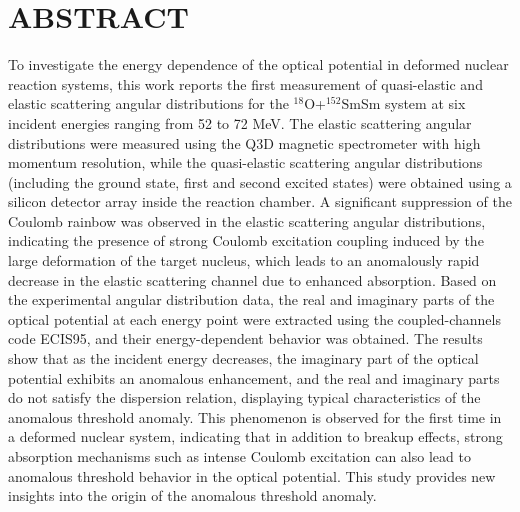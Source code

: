 \chapter*{ABSTRACT}%
\linespread{1.25}\selectfont%
To investigate the energy dependence of the optical potential in deformed nuclear reaction systems, this work reports the first measurement of quasi-elastic and elastic scattering angular distributions for the $^{18}\mathrm{O}$+$^{152}\mathrm{Sm}$Sm system at six incident energies ranging from 52 to 72 MeV. The elastic scattering angular distributions were measured using the Q3D magnetic spectrometer with high momentum resolution, while the quasi-elastic scattering angular distributions (including the ground state, first and second excited states) were obtained using a silicon detector array inside the reaction chamber. A significant suppression of the Coulomb rainbow was observed in the elastic scattering angular distributions, indicating the presence of strong Coulomb excitation coupling induced by the large deformation of the target nucleus, which leads to an anomalously rapid decrease in the elastic scattering channel due to enhanced absorption.
    Based on the experimental angular distribution data, the real and imaginary parts of the optical potential at each energy point were extracted using the coupled-channels code ECIS95, and their energy-dependent behavior was obtained. The results show that as the incident energy decreases, the imaginary part of the optical potential exhibits an anomalous enhancement, and the real and imaginary parts do not satisfy the dispersion relation, displaying typical characteristics of the anomalous threshold anomaly. This phenomenon is observed for the first time in a deformed nuclear system, indicating that in addition to breakup effects, strong absorption mechanisms such as intense Coulomb excitation can also lead to anomalous threshold behavior in the optical potential.
    This study provides new insights into the origin of the anomalous threshold anomaly.

